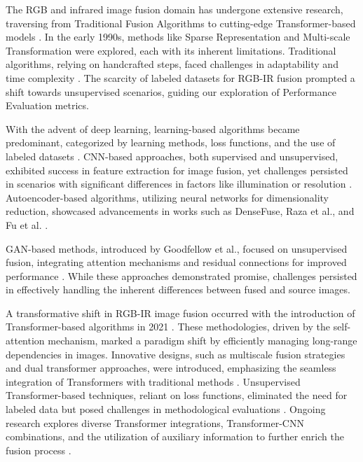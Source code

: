 \label{chp:RelatedWork}
\label{sec:traditional}
\label{sec:Transformer}
The RGB and infrared image fusion domain has undergone extensive research, traversing from Traditional Fusion Algorithms to cutting-edge Transformer-based models \cite{bin2016efficient, zhang2013dictionary, hu2017adaptive, he2017infrared, liu2012robust}. In the early 1990s, methods like Sparse Representation and Multi-scale Transformation were explored, each with its inherent limitations. Traditional algorithms, relying on handcrafted steps, faced challenges in adaptability and time complexity \cite{bin2016efficient, zhang2013dictionary, hu2017adaptive, he2017infrared, liu2012robust}. The scarcity of labeled datasets for RGB-IR fusion prompted a shift towards unsupervised scenarios, guiding our exploration of Performance Evaluation metrics.

With the advent of deep learning, learning-based algorithms became predominant, categorized by learning methods, loss functions, and the use of labeled datasets \cite{liu2018infrared, li2019infrared, raza2020pfaf, fu2021dual, goodfellow2014generative}. CNN-based approaches, both supervised and unsupervised, exhibited success in feature extraction for image fusion, yet challenges persisted in scenarios with significant differences in factors like illumination or resolution \cite{liu2018infrared}. Autoencoder-based algorithms, utilizing neural networks for dimensionality reduction, showcased advancements in works such as DenseFuse, Raza et al., and Fu et al. \cite{li2019infrared, raza2020pfaf, fu2021dual}.

GAN-based methods, introduced by Goodfellow et al., focused on unsupervised fusion, integrating attention mechanisms and residual connections for improved performance \cite{goodfellow2014generative, ma2020ganmcc, xu2019learning}. While these approaches demonstrated promise, challenges persisted in effectively handling the inherent differences between fused and source images.

A transformative shift in RGB-IR image fusion occurred with the introduction of Transformer-based algorithms in 2021 \cite{dosovitskiy2020image, liu2021swin, liu2022mfst}. These methodologies, driven by the self-attention mechanism, marked a paradigm shift by efficiently managing long-range dependencies in images. Innovative designs, such as multiscale fusion strategies and dual transformer approaches, were introduced, emphasizing the seamless integration of Transformers with traditional methods \cite{vs2022image, zhao2021dndt, fu2021ppt, wang2022swinfuse}. Unsupervised Transformer-based techniques, reliant on loss functions, eliminated the need for labeled data but posed challenges in methodological evaluations \cite{vs2022image, zhao2021dndt}. Ongoing research explores diverse Transformer integrations, Transformer-CNN combinations, and the utilization of auxiliary information to further enrich the fusion process \cite{vs2022image, zhao2021dndt, fu2021ppt, wang2022swinfuse}.


